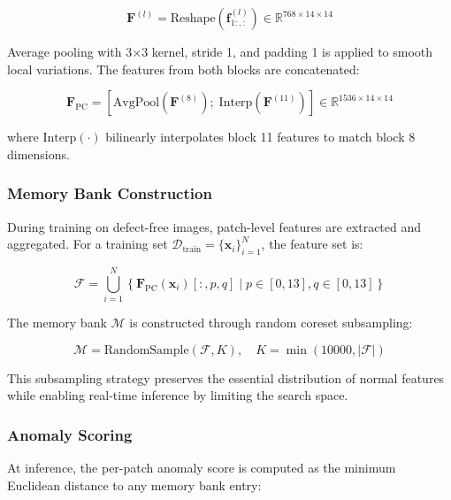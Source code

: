 \documentclass[journal]{IEEEtran}
\begin{document}
\begin{equation}
    \mathbf{F}^{(l)} = \text{Reshape}\left(\mathbf{f}^{(l)}_{1:, :}\right) \in \mathbb{R}^{768 \times 14 \times 14}
    \label{eq:spatial_feat}
\end{equation}

Average pooling with 3$\times$3 kernel, stride 1, and padding 1 is applied to smooth local variations. The features from both blocks are concatenated:

\begin{equation}
    \mathbf{F}_{\text{PC}} = \left[\text{AvgPool}(\mathbf{F}^{(8)});\; \text{Interp}(\mathbf{F}^{(11)})\right] \in \mathbb{R}^{1536 \times 14 \times 14}
    \label{eq:concat_feat}
\end{equation}

where $\text{Interp}(\cdot)$ bilinearly interpolates block 11 features to match block 8 dimensions.

\subsubsection{Memory Bank Construction}

During training on defect-free images, patch-level features are extracted and aggregated. For a training set $\mathcal{D}_{\text{train}} = \{\mathbf{x}_i\}_{i=1}^{N}$, the feature set is:

\begin{equation}
    \mathcal{F} = \bigcup_{i=1}^{N} \left\{\mathbf{F}_{\text{PC}}(\mathbf{x}_i)[:, p, q] \;|\; p\in[0,13], q\in[0,13]\right\}
    \label{eq:feature_set}
\end{equation}

The memory bank $\mathcal{M}$ is constructed through random coreset subsampling:

\begin{equation}
    \mathcal{M} = \text{RandomSample}(\mathcal{F}, K), \quad K = \min(10000, |\mathcal{F}|)
    \label{eq:coreset}
\end{equation}

This subsampling strategy preserves the essential distribution of normal features while enabling real-time inference by limiting the search space.

\subsubsection{Anomaly Scoring}

At inference, the per-patch anomaly score is computed as the minimum Euclidean distance to any memory bank entry:
\end{document}
